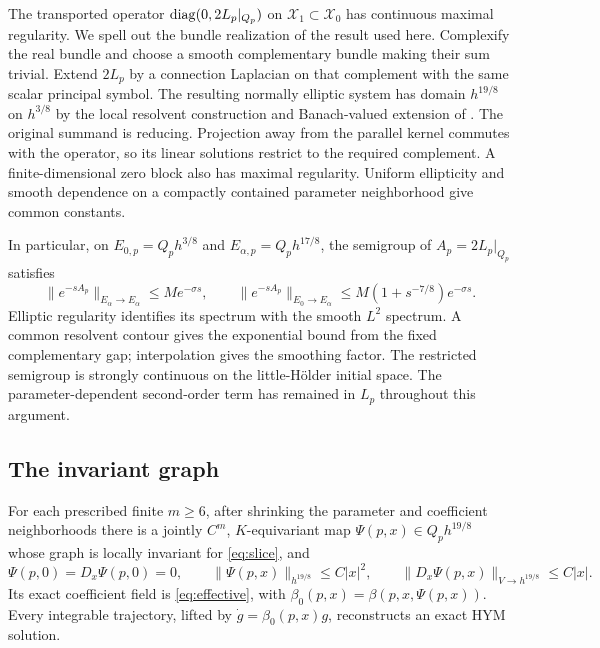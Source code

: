 The transported operator
$\operatorname{diag}(0,2L_p|_{Q_p})$ on $\mathcal X_1\subset\mathcal X_0$
has continuous maximal regularity. We spell out the bundle
realization of the result used here. Complexify the real bundle
and choose a smooth complementary bundle making their sum trivial.
Extend $2L_p$ by a connection Laplacian on that complement with
the same scalar principal symbol. The resulting normally elliptic
system has domain $h^{19/8}$ on $h^{3/8}$ by the local resolvent
construction and Banach-valued extension of
\cite[Remark~3.3, Theorem~3.6 and Proposition~3.7]{shaosimonett}.
The original summand is reducing. Projection away from the
parallel kernel commutes with the operator, so its linear
solutions restrict to the required complement. A finite-dimensional
zero block also has maximal regularity. Uniform ellipticity and
smooth dependence on a compactly contained parameter neighborhood
give common constants.

In particular, on
$E_{0,p}=Q_ph^{3/8}$ and $E_{\alpha,p}=Q_ph^{17/8}$,
the semigroup of $A_p=2L_p|_{Q_p}$ satisfies
\begin{equation}\label{eq:semigroup}
 \|e^{-sA_p}\|_{E_\alpha\to E_\alpha}\le Me^{-\sigma s},
 \qquad
 \|e^{-sA_p}\|_{E_0\to E_\alpha}
       \le M(1+s^{-7/8})e^{-\sigma s}.
\end{equation}
Elliptic regularity identifies its spectrum with the smooth
$L^2$ spectrum. A common resolvent contour gives the exponential
bound from the fixed complementary gap; interpolation gives the
smoothing factor. The restricted semigroup is strongly continuous
on the little-H\"older initial space. The parameter-dependent
second-order term has remained in $L_p$ throughout this argument.

\subsection{The invariant graph}
\begin{proposition}\label{prop:graph}
For each prescribed finite $m\ge6$, after shrinking the parameter
and coefficient neighborhoods there is a jointly $C^m$,
$K$-equivariant map $\Psi(p,x)\in Q_ph^{19/8}$ whose graph
is locally invariant for \eqref{eq:slice}, and
\begin{equation}\label{eq:graph-bounds}
 \Psi(p,0)=D_x\Psi(p,0)=0,\qquad
 \|\Psi(p,x)\|_{h^{19/8}}\le C|x|^2,\qquad
 \|D_x\Psi(p,x)\|_{V\to h^{19/8}}\le C|x|.
\end{equation}
Its exact coefficient field is \eqref{eq:effective}, with
$\beta_0(p,x)=\beta(p,x,\Psi(p,x))$.
Every integrable trajectory, lifted by
$\dot g=\beta_0(p,x)g$, reconstructs an exact HYM solution.
\end{proposition}

